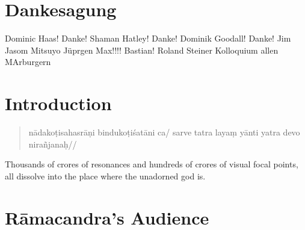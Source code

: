 %

\chapter{Dankesagung}
Dominic Haas! Danke!
Shaman Hatley! Danke!
Dominik Goodall! Danke!
Jim
Jasom
Mitsuyo
Jüprgen
Max!!!!
Bastian!
Roland Steiner
Kolloquium
allen MArburgern

\chapter{Introduction}
\mainmatter

\begin{quote}
nādakoṭisahasrāṇi bindukoṭiśatāni ca/
sarve tatra layaṃ yānti yatra devo nirañjanaḥ//
\end{quote}

Thousands of crores of resonances and hundreds of crores of visual focal points, all dissolve into the place where the unadorned god is.


\chapter{Rāmacandra's Audience}

